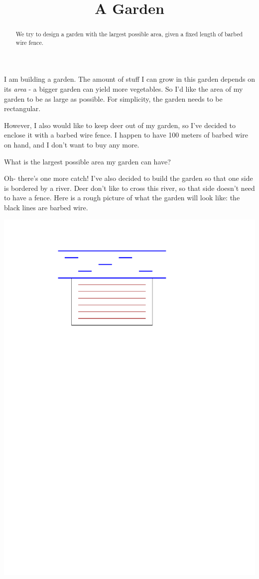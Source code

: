 \documentclass{ximera}
\title{A Garden}
\begin{document}
\begin{abstract}
We try to design a garden with the largest possible area, given a fixed length of barbed wire fence.
\end{abstract}

I am building a garden. The amount of stuff I can grow in this garden depends on its \emph{area} - a bigger garden can yield more vegetables. So I'd like the area of my garden to be as large as possible. For simplicity, the garden needs to be rectangular.

However, I also would like to keep deer out of my garden, so I've decided to enclose it with a barbed wire fence. I happen to have 100 meters of barbed wire on hand, and I don't want to buy any more.

\begin{question}
What is the largest possible area my garden can have?
\end{question}

Oh- there's one more catch! I've also decided to build the garden so that one side is bordered by a river. Deer don't like to cross this river, so that side doesn't need to have a fence. Here is a rough picture of what the garden will look like: the black lines are barbed wire.

\begin{center}
\includegraphics[scale=0.5]{GardenFig.pdf}
\end{center}
\end{document}
